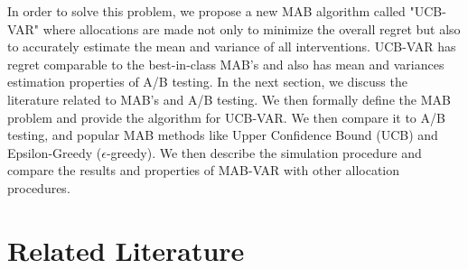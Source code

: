 \documentclass[12pt, letterpaper]{article}
\begin{document}
In order to solve this problem, we propose a new MAB algorithm called "UCB-VAR" where allocations are made not only to minimize the overall regret but also to accurately estimate the mean and variance of all interventions. UCB-VAR has regret comparable to the best-in-class MAB's and also has mean and variances estimation properties of A/B testing. In the next section, we discuss the literature related to MAB's and A/B testing. We then formally define the MAB problem and provide the algorithm for UCB-VAR. We then compare it to A/B testing, and popular MAB methods like Upper Confidence Bound (UCB) and Epsilon-Greedy ($\epsilon$-greedy). We then describe the simulation procedure and compare the results and properties of MAB-VAR with other allocation procedures.


\section*{Related Literature}
\end{document}
